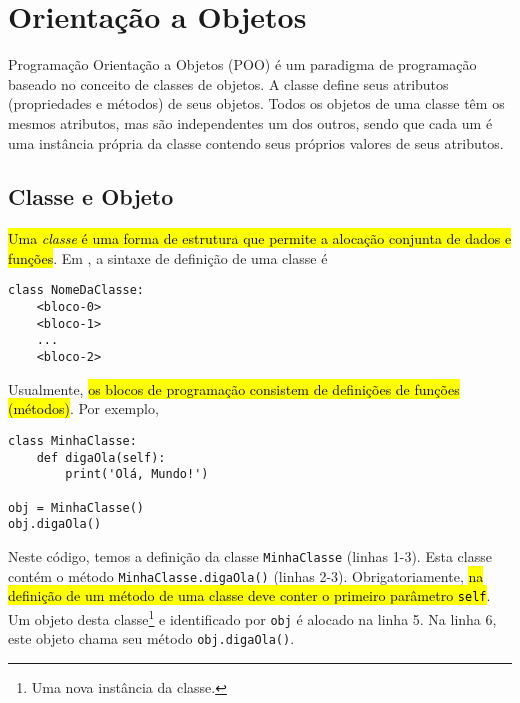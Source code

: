 
\chapter{Orientação a Objetos}\label{cap_poo}
\thispagestyle{fancy}

Programação Orientação a Objetos (POO) é um paradigma de programação baseado no conceito de classes de objetos. A classe define seus atributos (propriedades e métodos) de seus objetos. Todos os objetos de uma classe têm os mesmos atributos, mas são independentes um dos outros, sendo que cada um é uma instância própria da classe contendo seus próprios valores de seus atributos.

\section{Classe e Objeto}\label{cap_ob_sec_class}

\hl{Uma \emph{classe} é uma forma de estrutura que permite a alocação conjunta de dados e funções}. Em {\python}, a sintaxe de definição de uma classe é
\begin{lstlisting}
class NomeDaClasse:
    <bloco-0>
    <bloco-1>
    ...
    <bloco-2>
\end{lstlisting}
Usualmente, \hl{os blocos de programação consistem de definições de funções (métodos)}. Por exemplo,
\begin{lstlisting}
class MinhaClasse:
    def digaOla(self):
        print('Olá, Mundo!')

obj = MinhaClasse()
obj.digaOla()
\end{lstlisting}
Neste código, temos a definição da classe \lstinline+MinhaClasse+ (linhas 1-3). Esta classe contém o método \lstinline+MinhaClasse.digaOla()+ (linhas 2-3). Obrigatoriamente, \hl{na definição de um método de uma classe deve conter o primeiro parâmetro {\lstinline+self+}}. Um objeto desta classe\footnote{Uma nova instância da classe.} e identificado por \lstinline+obj+ é alocado na linha 5. Na linha 6, este objeto chama seu método \lstinline+obj.digaOla()+.

